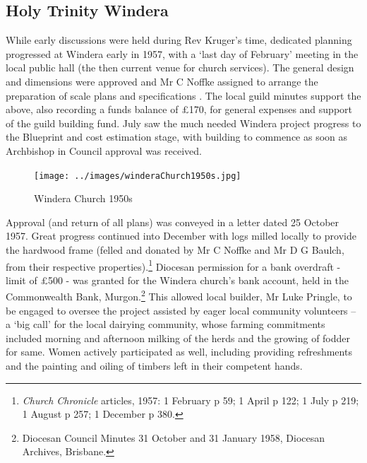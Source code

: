 \subsection{Holy Trinity Windera}



While early discussions were held during Rev Kruger's time, dedicated planning progressed at Windera early in 1957, with a `last day of February' meeting in the local public hall (the then current venue for church services). The general design and dimensions were approved and Mr C Noffke assigned to arrange the preparation of scale plans and specifications . The local guild minutes support the above, also recording a funds balance of \pounds170, for general expenses and support of the guild building fund. July saw the much needed Windera project progress to the Blueprint and cost estimation stage, with building to commence as soon as Archbishop in Council approval was received.









\begin{figure}[!htb]
\begin{center}
\texttt{[image: ../images/winderaChurch1950s.jpg]}
\caption{Windera Church 1950s}
\end{center}
\end{figure}




Approval (and return of all plans) was conveyed in a letter dated 25 October 1957. Great progress continued into December with logs milled locally to provide the hardwood frame (felled and donated by Mr C Noffke and Mr D G Baulch, from their respective properties).\footnote{\emph{Church Chronicle} articles, 1957: 1 February p 59; 1 April p 122; 1 July p 219; 1 August p 257; 1 December p 380.} Diocesan permission for a bank overdraft - limit of \pounds500 - was granted for the Windera church's bank account, held in the Commonwealth Bank, Murgon.\footnote{Diocesan Council Minutes 31 October and 31 January 1958, Diocesan Archives, Brisbane.} This allowed local builder, Mr Luke Pringle, to be engaged to oversee the project assisted by eager local community volunteers -- a `big call' for the local dairying community, whose farming commitments included morning and afternoon milking of the herds and the growing of fodder for same. Women actively participated as well, including providing refreshments and the painting and oiling of timbers left in their competent hands.


